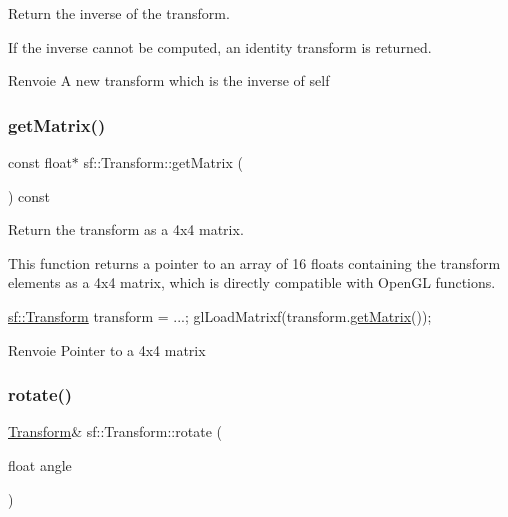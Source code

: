 Return the inverse of the transform. 

If the inverse cannot be computed, an identity transform is returned.

\begin{DoxyReturn}{Renvoie}
A new transform which is the inverse of self 
\end{DoxyReturn}
\mbox{\label{classsf_1_1Transform_ad52616cac686f47bd26bcbdd8e2add40}} 
\subsubsection{\texorpdfstring{get\+Matrix()}{getMatrix()}}
{\footnotesize\ttfamily const float$\ast$ sf\+::\+Transform\+::get\+Matrix (\begin{DoxyParamCaption}{ }\end{DoxyParamCaption}) const}



Return the transform as a 4x4 matrix. 

This function returns a pointer to an array of 16 floats containing the transform elements as a 4x4 matrix, which is directly compatible with Open\+GL functions.


\begin{DoxyCode}
\hyperlink{classsf_1_1Transform}{sf::Transform} transform = ...;
glLoadMatrixf(transform.\hyperlink{classsf_1_1Transform_ad52616cac686f47bd26bcbdd8e2add40}{getMatrix}());
\end{DoxyCode}


\begin{DoxyReturn}{Renvoie}
Pointer to a 4x4 matrix 
\end{DoxyReturn}
\mbox{\label{classsf_1_1Transform_a3e548c3c9e3fb9d4bd43cf852669e555}} 
\subsubsection{\texorpdfstring{rotate()}{rotate()}\hspace{0.1cm}{\footnotesize\ttfamily [1/3]}}
{\footnotesize\ttfamily \hyperlink{classsf_1_1Transform}{Transform}\& sf\+::\+Transform\+::rotate (\begin{DoxyParamCaption}\item[{float}]{angle }\end{DoxyParamCaption})}



